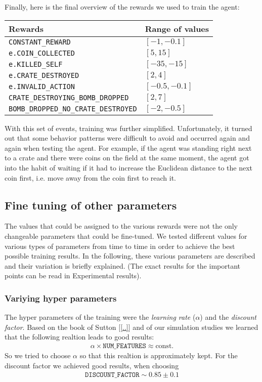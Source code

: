Finally, here is the final overview of the rewards we used to train the agent:

\begin{table}[h!]
\centering
\begin{tabular}{|| l | l ||} 
 \hline
 Rewards &  Range of values\\ [0.5ex] 
 \hline\hline
  \texttt{CONSTANT\_REWARD} & $[-1,-0.1]$  \\[0.5ex] 
  \texttt{e.COIN\_COLLECTED} & $[5, 15]$ \\ [0.5ex] 
  \texttt{e.KILLED\_SELF} & $[-35 , -15]$ \\[0.5ex] 
  \texttt{e.CRATE\_DESTROYED} & $[2, 4]$ \\[0.5ex] 
  \texttt{e.INVALID\_ACTION} & $[-0.5,-0.1]$  \\[0.5ex] 
  \texttt{CRATE\_DESTROYING\_BOMB\_DROPPED} & $[2,7]$  \\[0.5ex] 
  \texttt{BOMB\_DROPPED\_NO\_CRATE\_DESTROYED} & $[-2,-0.5]$  \\[1ex] 
 \hline
\end{tabular}
\end{table}

With this set of events, training was further simplified. Unfortunately, it turned out that some behavior patterns were difficult to avoid and occurred again and again when testing the agent. For example, if the agent was standing right next to a crate and there were coins on the field at the same moment, the agent got into the habit of waiting if it had to increase the Euclidean distance to the next coin first, i.e. move away from the coin first to reach it.

\subsection{Fine tuning of other parameters}
The values that could be assigned to the various rewards were not the only changeable parameters that could be fine-tuned. We tested different values for various types of parameters from time to time in order to achieve the best possible training results. In the following, these various parameters are described and their variation is briefly explained. (The exact results for the important points can be read in Experimental results).

\subsubsection*{Variying hyper parameters}
The hyper parameters of the training were the \textit{learning rate} ($\alpha$) and the \textit{discount factor}. Based on the book of Sutton [\ref{..}] and of our simulation studies we learned that the following realtion leads to good results:
\begin{align*}
\alpha \times \texttt{NUM\_FEATURES} \approx \text{const.}
\end{align*}
So we tried to choose $\alpha$ so that this realtion is approximately kept. For the discount factor we achieved good results, when choosing 
\begin{align*}
\texttt{DISCOUNT\_FACTOR} \sim 0.85 \pm 0.1
\end{align*}


